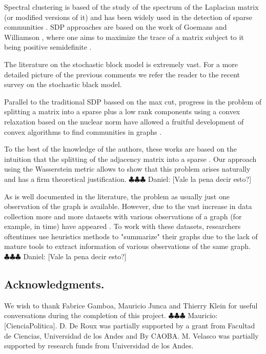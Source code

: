 \documentclass[12pt]{amsart}
\theoremstyle{remark}
\newcommand{\ddr}[1]{{\color{blue} \sf $\clubsuit\clubsuit\clubsuit$ Daniel: [#1]}}
\newcommand{\mv}[1]{{\color{red} \sf $\clubsuit\clubsuit\clubsuit$ Mauricio: [#1]}}
\begin{document}
Spectral clustering is based of the study of the spectrum of the Laplacian matrix (or modified versions of it) and has been widely used in the detection of sparse communities \cite{bordenave2015non, chin2015stochastic,krzakala2013spectral, massoulie2014community}. 
SDP approaches are based on the work of Goemans and Williamson \cite{goemans1995improved},
where one aims to maximize the trace of a matrix subject to it being positive semidefinite \cite{abbe2016exact,guedon2016community, montanari2016semidefinite}.

The literature on the stochastic block model is extremely vast. For a more detailed picture of the previous comments we refer the reader to the recent survey on the stochastic black model\cite{abbe2017community}.


Parallel to the traditional SDP bassed on the max cut, progress in the problem of splitting a matrix into a sparse  plus a low rank components using a convex relaxation based on the nuclear norm \cite{candes2011robust,chandrasekaran2011rank,candes2009exact} have allowed a fruitful development of  convex algorithms to find communities in graphs \cite{ames2011nuclear,vinayak2014sharp,chen2012clustering,chen2014clustering,oymak2011finding,ailon2013breaking}.

To the best of the knowledge of the authors, these works are based on the intuition that the splitting of the adjacency  matrix into a sparse . Our approach using the Wasserstein metric allows to show that this problem arises naturally and has a firm theoretical justification. \ddr{Vale la pena decir esto?}

As is well documented in the literature, the problem as usually just one observation of the graph is available. However, due to the vast increase in data collection more and more datasets with various observations of a graph (for example, in time) have appeared \cite{snapnets}. To work with these datasets, researchers oftentimes use heuristics methods to "summarize" their graphs due to the lack of mature tools to extract information of various observations of the same graph.  \ddr{Vale la pena decir esto?}



\subsection{Acknowledgments.}
We wish to thank Fabrice Gamboa, Mauricio Junca and Thierry Klein for useful conversations during the completion of this project. \mv{CienciaPolitica}.
D. De Roux was partially supported by a grant from Facultad de Ciencias, Universidad de los Andes and By CAOBA. M. Velasco was partially supported by research funds from Universidad de los Andes. 
\end{document}
